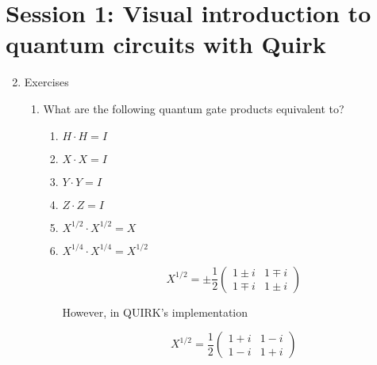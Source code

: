 \documentclass[11pt]{article}
\begin{document}
\section*{\huge Session 1: Visual introduction to quantum circuits with Quirk}
\begin{enumerate}[label*=\arabic*.]
\setcounter{enumi}{1}
    \item Exercises
    \begin{enumerate}[label*=\arabic*.]
        \item What are the following quantum gate products equivalent to?
        \begin{enumerate}[label=(\alph*)]
            \item $H\cdot H = I$
            \item $X\cdot X = I$
            \item $Y\cdot Y = I$
            \item $Z\cdot Z = I$
            \item $X^{1/2}\cdot X^{1/2} = X$
            \item $X^{1/4}\cdot X^{1/4} = X^{1/2} $

            $$
            X^{1/2} = \pm\frac{1}{2}
            \begin{pmatrix}
             1\pm i & 1\mp i \\
             1\mp i & 1\pm i
            \end{pmatrix}
            $$

            However, in QUIRK's implementation

            $$
            X^{1/2} = \frac{1}{2}
            \begin{pmatrix}
            1+i & 1-i \\
            1-i & 1+i
            \end{pmatrix}
            $$
            

\end{enumerate}
\end{enumerate}
\end{enumerate}
\end{document}
